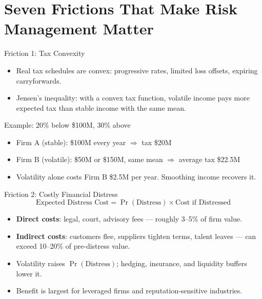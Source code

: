 \documentclass[11pt, aspectratio=169]{beamer}
\begin{document}
\section{Seven Frictions That Make Risk Management Matter}

\begin{frame}{Friction 1: Tax Convexity}
\begin{itemize}
  \item Real tax schedules are convex: progressive rates, limited loss offsets, expiring carryforwards.
  \item Jensen's inequality: with a convex tax function, \alert{volatile income pays more expected tax} than stable income with the same mean.
\end{itemize}
\medskip
\begin{exampleblock}{Example: 20\% below \$100M, 30\% above}
\begin{itemize}
  \item Firm A (stable): \$100M every year $\Rightarrow$ tax \$20M
  \item Firm B (volatile): \$50M or \$150M, same mean $\Rightarrow$ average tax \$22.5M
  \item Volatility alone costs Firm B \alert{\$2.5M per year}. Smoothing income recovers it.
\end{itemize}
\end{exampleblock}
\end{frame}

\begin{frame}{Friction 2: Costly Financial Distress}
\[
\text{Expected Distress Cost} = \Pr(\text{Distress}) \times \text{Cost if Distressed}
\]
\begin{itemize}
  \item \textbf{Direct costs}: legal, court, advisory fees --- roughly 3--5\% of firm value.
  \item \textbf{Indirect costs}: customers flee, suppliers tighten terms, talent leaves --- can exceed 10--20\% of pre-distress value.
  \item Volatility raises $\Pr(\text{Distress})$; hedging, insurance, and liquidity buffers lower it.
  \item Benefit is largest for leveraged firms and reputation-sensitive industries.
\end{itemize}
\end{frame}
\end{document}
